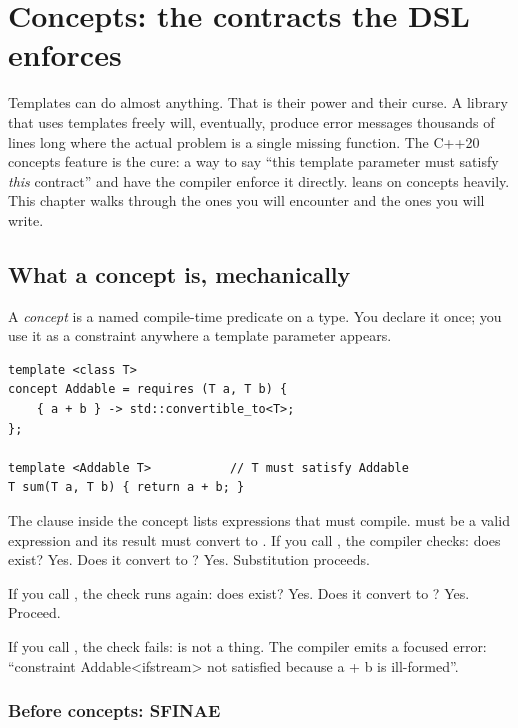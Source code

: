 \chapter{Concepts: the contracts the DSL enforces}
\label{ch:concepts}

\begin{aside}
Templates can do almost anything. That is their power and their
curse. A library that uses templates freely will, eventually,
produce error messages thousands of lines long where the actual
problem is a single missing function. The C++20 concepts feature
is the cure: a way to say ``this template parameter must satisfy
\emph{this} contract'' and have the compiler enforce it directly.
\maya{} leans on concepts heavily. This chapter walks through the
ones you will encounter and the ones you will write.
\end{aside}

\section{What a concept is, mechanically}

A \emph{concept} is a named compile-time predicate on a type. You
declare it once; you use it as a constraint anywhere a template
parameter appears.

\begin{lstlisting}
template <class T>
concept Addable = requires (T a, T b) {
    { a + b } -> std::convertible_to<T>;
};

template <Addable T>           // T must satisfy Addable
T sum(T a, T b) { return a + b; }
\end{lstlisting}

The  clause inside the concept lists expressions
that must compile.  must be a valid expression and
its result must convert to . If you call ,
the compiler checks: does  exist? Yes. Does it
convert to ? Yes. Substitution proceeds.

If you call , the
check runs again: does  exist? Yes. Does it
convert to ? Yes. Proceed.

If you call , the
check fails:  is not a thing. The
compiler emits a focused error: ``constraint Addable<ifstream>
not satisfied because a + b is ill-formed''.

\subsection*{Before concepts: SFINAE}

